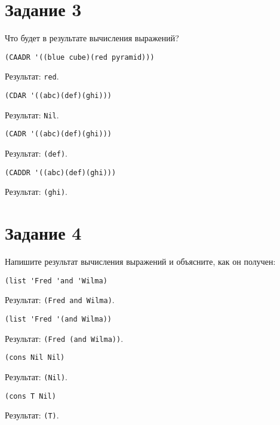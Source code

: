 \section*{Задание 3}

\begin{flushleft}
	Что будет в результате вычисления выражений?
\end{flushleft}

\begin{lstlisting}
(CAADR '((blue cube)(red pyramid)))
\end{lstlisting}
Результат: \texttt{red}.
\vspace{10mm}


\begin{lstlisting}
(CDAR '((abc)(def)(ghi)))
\end{lstlisting}
Результат: \texttt{Nil}.
\vspace{10mm}


\begin{lstlisting}
(CADR '((abc)(def)(ghi)))
\end{lstlisting}
Результат: \texttt{(def)}.
\vspace{10mm}


\begin{lstlisting}
(CADDR '((abc)(def)(ghi)))
\end{lstlisting}
Результат: \texttt{(ghi)}.
\vspace{10mm}

\section*{Задание 4}
Напишите результат вычисления выражений и объясните, как он получен:

\begin{lstlisting}
(list 'Fred 'and 'Wilma)
\end{lstlisting}
Результат: \texttt{(Fred and Wilma)}.
\vspace{10mm}


\begin{lstlisting}
(list 'Fred '(and Wilma))
\end{lstlisting}
Результат: \texttt{(Fred (and Wilma))}.
\vspace{10mm}


\begin{lstlisting}
(cons Nil Nil)
\end{lstlisting}
Результат: \texttt{(Nil)}.
\vspace{10mm}


\begin{lstlisting}
(cons T Nil)
\end{lstlisting}
Результат: \texttt{(T)}.
\vspace{10mm}

